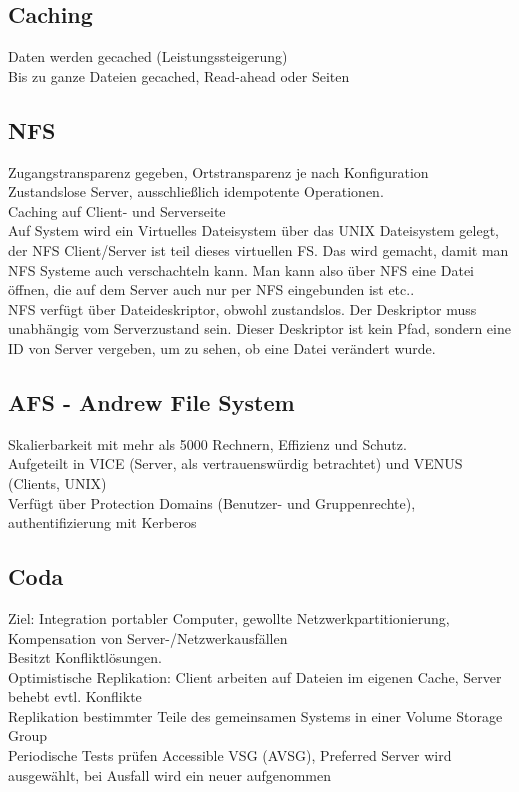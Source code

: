 \documentclass[a4paper]{article}
\begin{document}
\subsection{Caching}
Daten werden gecached (Leistungssteigerung)\\
Bis zu ganze Dateien gecached, Read-ahead oder Seiten\\
\subsection{NFS}
Zugangstransparenz gegeben, Ortstransparenz je nach Konfiguration\\
Zustandslose Server, ausschließlich idempotente Operationen.\\
Caching auf Client- und Serverseite\\
Auf System wird ein Virtuelles Dateisystem über das UNIX Dateisystem gelegt, der NFS Client/Server ist teil dieses virtuellen FS. Das wird gemacht, damit man NFS Systeme auch verschachteln kann. Man kann also über NFS eine Datei öffnen, die auf dem Server auch nur per NFS eingebunden ist etc..\\
NFS verfügt über Dateideskriptor, obwohl zustandslos. Der Deskriptor muss unabhängig vom Serverzustand sein. Dieser Deskriptor ist kein Pfad, sondern eine ID von Server vergeben, um zu sehen, ob eine Datei verändert wurde.
\subsection{AFS - Andrew File System}
Skalierbarkeit mit mehr als 5000 Rechnern, Effizienz und Schutz.\\
Aufgeteilt in VICE (Server, als vertrauenswürdig betrachtet) und VENUS (Clients, UNIX)\\
Verfügt über Protection Domains (Benutzer- und Gruppenrechte), authentifizierung mit Kerberos\\
\subsection{Coda}
Ziel: Integration portabler Computer, gewollte Netzwerkpartitionierung, Kompensation von Server-/Netzwerkausfällen\\
Besitzt Konfliktlösungen.\\
Optimistische Replikation: Client arbeiten auf Dateien im eigenen Cache, Server behebt evtl. Konflikte\\
Replikation bestimmter Teile des gemeinsamen Systems in einer Volume Storage Group\\
Periodische Tests prüfen Accessible VSG (AVSG), Preferred Server wird ausgewählt, bei Ausfall wird ein neuer aufgenommen\\
\end{document}
